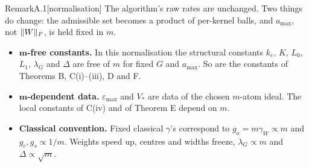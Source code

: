 \begin{rmk}{Remark}{A.1}[normalisation]
The algorithm's raw rates are unchanged. Two things do change: the admissible set becomes a product of per-kernel
balls, and $a_{\max}$, not $\lVert W\rVert_F$, is held fixed in $m$.
\begin{itemize}
  \item \textbf{$\bm{m}$-free constants.} In this normalisation the structural constants $k_e$, $K$, $L_0$, $L_1$,
    $\lambda_G$ and $\Delta$ are free of $m$ for fixed $G$ and $a_{\max}$. So are the constants of Theorems B,
    C(i)--(iii), D and F.
  \item \textbf{$\bm{m}$-dependent data.} $\varepsilon_{\max}$ and $V_*$ are data of the chosen $m$-atom ideal. The
    local constants of C(iv) and of Theorem E depend on $m$.
  \item \textbf{Classical convention.} Fixed classical $\gamma$'s correspond to $g_a = m\gamma_W\propto m$ and
    $g_c, g_s\propto 1/m$. Weights speed up, centres and widths freeze, $\lambda_G\propto m$ and
    $\Delta\propto\sqrt m$.
\end{itemize}
\end{rmk}
